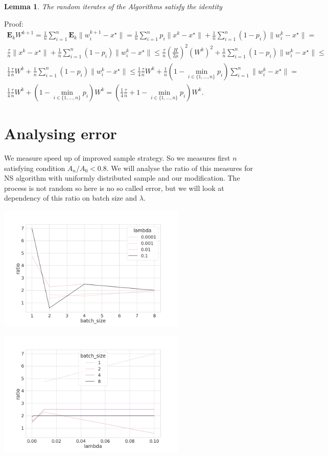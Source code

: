 \documentclass{article}
\newtheorem{lemma}[theorem]{Lemma}
\begin{document}
\begin{lemma} The random iterates of the Algorithms satisfy the identity
\end{lemma}
Proof:
\begin{equation*}
\begin{split}
    \mathbf{E}_k W^{k + 1} = \frac{1}{n}\sum\limits_{i=1}^{n}\mathbf{E}_k\|w_i^{k + 1} - x^\star\| =
     \frac{1}{n}\sum\limits_{i=1}^{n}p_i\|x^k - x^\star\| + \frac{1}{n}\sum\limits_{i=1}^{n}(1 - p_i)\|w_i^k - x^\star\| = \\
     \frac{\tau}{n}\|x^k - x^\star\| + \frac{1}{n}\sum\limits_{i=1}^{n}(1 - p_i)\|w_i^k - x^\star\| \leq
     \frac{\tau}{n}\left(\frac{H}{2\mu}\right)^2\left(W^k\right)^2 + \frac{1}{n}\sum\limits_{i=1}^{n}(1 - p_i)\|w_i^k - x^\star\| \leq \\
     \frac{1}{4}\frac{\tau}{n}W^k + \frac{1}{n}\sum\limits_{i=1}^{n}(1 - p_i)\|w_i^k - x^\star\| \leq \frac{1}{4}\frac{\tau}{n}W^k + \frac{1}{n}(1 - \min_{i \in \{1, \dots, n\}}{p_i})\sum\limits_{i=1}^{n}\|w_i^k - x^\star\|  = \\ \frac{1}{4}\frac{\tau}{n}W^k + (1 - \min_{i \in \{1, \dots, n\}}{p_i})W^k =  \left(\frac{1}{4}\frac{\tau}{n} + 1 - \min_{i \in \{1, \dots, n\}}{p_i}\right)W^k.
\end{split}
\end{equation*}

\section{Analysing error}

We measure speed up of improved sample strategy. So we measures first $n$ satisfying condition $A_n/A_0 < 0.8$.
We will analyse the ratio of this measures for NS algorithm with uniformly distributed sample and our modification.
The process is not random so here is no so called error, but we will look at dependency of this ratio on batch size and $\lambda$.

\includegraphics[width=90mm]{lambda.png}

\includegraphics[width=90mm]{batch_size.png}

\newpage
{}



\printbibliography
\end{document}
